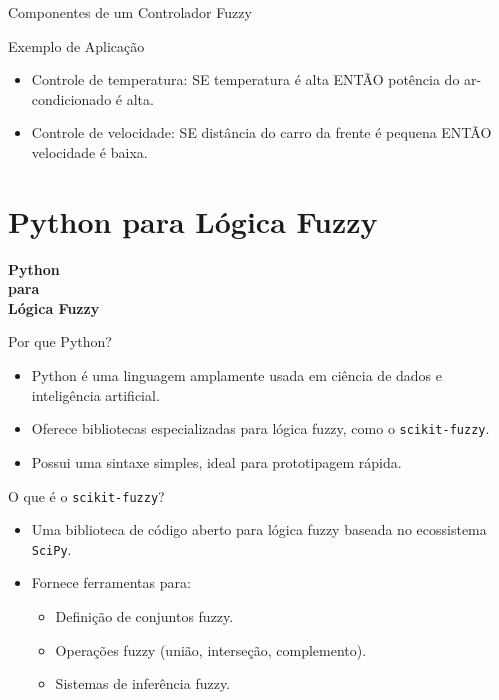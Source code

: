\documentclass{beamer}
\begin{document}
\begin{frame}{Componentes de um Controlador Fuzzy}
    \begin{block}{Exemplo de Aplicação}
        \begin{itemize}
            \item Controle de temperatura: SE temperatura é alta ENTÃO potência do ar-condicionado é alta.
            \item Controle de velocidade: SE distância do carro da frente é pequena ENTÃO velocidade é baixa.
        \end{itemize}
    \end{block}
\end{frame}

\section{Python para Lógica Fuzzy}
\begin{frame}
\centering
\Huge
\textbf{Python\\para\\Lógica Fuzzy}
\end{frame}
\begin{frame}{}
    \begin{block}{Por que Python?}
        \begin{itemize}
            \item Python é uma linguagem amplamente usada em ciência de dados e inteligência artificial.
            \item Oferece bibliotecas especializadas para lógica fuzzy, como o \texttt{scikit-fuzzy}.
            \item Possui uma sintaxe simples, ideal para prototipagem rápida.
        \end{itemize}
    \end{block}
    \pause
    \begin{block}{O que é o \texttt{scikit-fuzzy}?}
        \begin{itemize}
            \item Uma biblioteca de código aberto para lógica fuzzy baseada no ecossistema \texttt{SciPy}.
            \item Fornece ferramentas para:
            \begin{itemize}
                \item Definição de conjuntos fuzzy.
                \item Operações fuzzy (união, interseção, complemento).
                \item Sistemas de inferência fuzzy.
            \end{itemize}
        \end{itemize}
    \end{block}

\end{frame}
\end{document}
